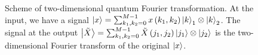 \begin{figure}
\centering



\caption{Scheme of two-dimensional quantum Fourier transformation. At the input, we have a signal $\ket{x} = \sum_{k_1,k_2=0}^{M-1} x\left(k_1, k_2\right)\ket{k}_1 \otimes \ket{k}_2$. The signal at the output $\ket{\tilde{X}} = \sum_{k_1,k_2=0}^{M-1} \tilde{X}\left(j_1, j_2\right) \ket{j_1} \otimes \ket{j_2}$ is the two-dimensional Fourier transform of the original $\ket{x}$.}
\label{figQuantCompQuantFourier2d}
\end{figure}